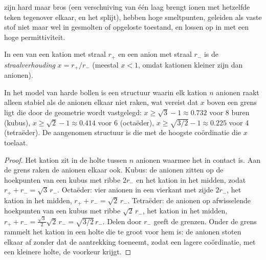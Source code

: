\begin{proposition}\label{prop:b1:crystals-ionic-covalent:ionic-properties}
 zijn hard maar bros (een verschuiving van één laag brengt
ionen met hetzelfde teken tegenover elkaar, en het  splijt), hebben
hoge smeltpunten, geleiden als vaste stof niet maar wel in gesmolten of
opgeloste toestand, en lossen op in  met een hoge
permittiviteit.
\end{proposition}
\admitted

\begin{definition}[Straalverhouding]\label{def:b1:crystals-ionic-covalent:radius-ratio}
In een  van een kation met straal $r_+$ en een anion met straal
$r_-$ is de \emph{straalverhouding} $x = r_+/r_-$
(meestal $x < 1$, omdat kationen kleiner zijn dan anionen).
\end{definition}

\begin{proposition}\label{prop:b1:crystals-ionic-covalent:rule}
In het model van harde bollen is een structuur waarin elk kation $n$
anionen raakt alleen stabiel als de anionen elkaar niet raken, wat vereist
dat $x$ boven een grens ligt die door de geometrie wordt vastgelegd:
$x \ge \sqrt3 - 1
\approx 0.732$ voor 8 buren (kubus), $x \ge \sqrt2 - 1 \approx 0.414$
voor 6 (octaëder), $x \ge \sqrt{3/2} - 1 \approx 0.225$ voor 4
(tetraëder). De aangenomen structuur is die met de hoogste coördinatie
die $x$ toelaat.
\end{proposition}

\begin{proof}
Het kation zit in de holte tussen $n$ anionen waarmee het in contact is.
Aan de grens raken de anionen elkaar ook. Kubus: de anionen zitten op de
hoekpunten van een kubus met ribbe $2r_-$ en het kation in het midden,
zodat $r_+ +
r_- = \sqrt3\,r_-$. Octaëder: vier anionen in een vierkant met zijde
$2r_-$, het kation in het midden, $r_+ + r_- = \sqrt2\,r_-$. Tetraëder:
de anionen op afwisselende hoekpunten van een kubus met ribbe
$\sqrt2\,r_-$, het kation in het midden,
$r_+ + r_- = \frac{\sqrt3}{2}\sqrt2\,r_- = \sqrt{3/2}\,r_-$. Delen door
$r_-$ geeft de grenzen. Onder de grens rammelt het kation in een holte die
te groot voor hem is: de anionen stoten elkaar af zonder dat de
aantrekking toeneemt, zodat een lagere coördinatie, met een kleinere
holte, de voorkeur krijgt.
\end{proof}

